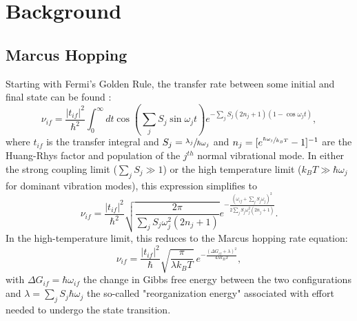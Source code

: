 \documentclass[11pt]{article}
\newcommand{\kt}{k_B T}
\begin{document}
\section{Background}

\subsection{Marcus Hopping}

Starting with Fermi's Golden Rule, the transfer rate between some initial and final state can be found \cite{jortner76, lin02, nan09}:
\begin{equation}
\nu_{if} = \frac{|t_{if}|^2}{\hbar^2} \int_0^\infty dt \cos \left(\sum_j S_j\sin \omega_jt \right) e^{-\sum_j S_j (2n_j+1)(1-\cos \omega_jt)},
\end{equation}
where $t_{if}$ is the transfer integral and $S_j = \sfrac{\lambda_j}{\hbar\omega_j}$ and $n_j = [e^{\sfrac{\hbar\omega_j}{\kt}}-1]^{-1}$ are the Huang-Rhys factor and population of the $j^{th}$ normal vibrational mode. In either the strong coupling limit ($\sum_j S_j \gg 1$) or the high temperature limit ($\kt \gg \hbar \omega_j$ for dominant vibration modes), this expression simplifies to \cite{shuai12}
\begin{equation}
\nu_{if} = \frac{|t_{if}|^2}{\hbar^2} \sqrt{\frac{2\pi}{\sum_j S_j \omega_j^2(2n_j+1)}} e^{-\frac{(\omega_{if}+\sum_j S_j \omega_j)^2}{2\sum_j S_j\omega_j^2(2n_j+1)}}.
\end{equation}
In the high-temperature limit, this reduces to the Marcus hopping rate equation:
\begin{equation}
\nu_{if} = \frac{|t_{if}|^2}{\hbar} \sqrt{\frac{\pi}{\lambda \kt}} \: e^{-\frac{(\Delta G_{if}+\lambda)^2}{4\lambda \kt}},
\end{equation}
with $\Delta G_{if} = \hbar \omega_{if}$ the change in Gibbs free energy between the two configurations and $\lambda = \sum_j S_j \hbar \omega_j$ the so-called "reorganization energy" associated with effort needed to undergo the state transition.
\end{document}

